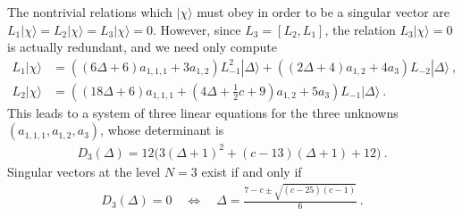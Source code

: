 \documentclass[12pt,a4paper,notitlepage]{report}
\numberwithin{equation}{section}
\theoremstyle{break}
\begin{document}
The nontrivial relations which $|\chi\rangle$ must obey in order to be a singular vector are $L_1|\chi\rangle =L_2|\chi\rangle= L_3 |\chi\rangle=0$.
However, since $L_3 = [L_2,L_1]$, the relation $L_3|\chi\rangle=0$ is actually redundant, and we need only compute
\begin{align}
 L_1|\chi\rangle &= \left((6\Delta+6)a_{1,1,1}+3a_{1,2}\right)L_{-1}^2|\Delta\rangle +\left((2\Delta+4)a_{1,2}+4a_3\right)L_{-2}|\Delta\rangle\ ,
\\
L_2|\chi\rangle &= \left((18\Delta+6)a_{1,1,1}+(4\Delta+\tfrac12c +9)a_{1,2}+5a_3\right)L_{-1}|\Delta\rangle\ .
\end{align}
This leads to a system of three linear equations for the three unknowns $(a_{1,1,1},a_{1,2},a_3)$, whose determinant is
\begin{align}
 D_3(\Delta) = 12\Big(3(\Delta+1)^2+(c-13)(\Delta+1)+12\Big)\ .
\end{align}
Singular vectors at the level $N=3$ exist if and only if 
\begin{align}
 D_3(\Delta) = 0 \quad \Leftrightarrow \quad \Delta = \frac{7-c\pm\sqrt{(c-25)(c-1)}}{6}\ .
\end{align}
\end{document}
